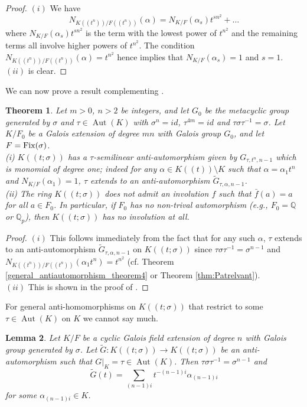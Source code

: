 \documentclass{amsart}
\theoremstyle{plain}
\newtheorem{theorem}{Theorem}[section]
\newtheorem{lemma}[theorem]{Lemma}
\theoremstyle{definition}
\numberwithin{equation}{section}
\numberwithin{figure}{section}
\DeclareMathOperator{\Aut}{Aut}
\begin{document}
 \begin{proof} $(i)$ We have
 $$N_{K((t^n))/F((t^n))}(\alpha)=N_{K/F}(\alpha_s)t^{sn^2}+\dots $$
 where $N_{K/F}(\alpha_s)t^{sn^2}$ is the term with the lowest power of $t^{n^2}$ and the remaining terms all involve higher powers of $t^{n^2}$. The condition
 $N_{K((t^n))/F((t^n))}(\alpha)=t^{n^2}$ hence implies that $N_{K/F}(\alpha_s)=1$ and $s=1$.
 \\ $(ii)$ is clear.
 \end{proof}


We can now  prove a result complementing \cite[Theorem 4.4]{MST}.

\begin{theorem}\label{thm:Patmain}
Let $m>0$, $n>2$ be integers, and let $G_0$ be the metacyclic group generated by $\sigma$ and $\tau\in \Aut(K)$ with $\sigma^n=id$, $\tau^{4m}=id$ and $\tau\sigma\tau^{-1}=\sigma$.
Let $K/F_0$ be a  Galois extension of degree $mn$ with Galois group $G_0$, and let $F={\rm Fix}(\sigma)$.
\\ (i) $K((t;\sigma))$ has a $\tau$-semilinear anti-automorphism given by $G_{\tau,t^n,n-1}$ which is monomial of degree one; indeed for any  $\alpha\in K((t))\setminus K$ such that $\alpha=\alpha_1 t^n$ and $N_{K/F}(\alpha_1)=1$, $\tau$ extends to an anti-automorphism $\widetilde G_{\tau,\alpha,n-1}$.
\\ (ii)
The ring $K((t;\sigma))$ does not admit an involution $f$ such that $\bar f(a)=a$ for all $a\in F_0$. In particular, if $F_0$ has no non-trival automorphism (e.g., $F_0=\mathbb{Q}$ or $\mathbb{Q}_p$), then $K((t;\sigma))$ has no involution at all.
\end{theorem}

\begin{proof}
$(i)$ This follows immediately from the fact  that for any  such $\alpha$, $\tau$ extends to an anti-automorphism $\widetilde G_{\tau,\alpha,n-1}$ on  $K((t;\sigma))$ since  $\tau \sigma\tau^{-1}=\sigma^{n-1}$ and $N_{K((t^n))/F((t^n))}(\alpha_1 t^n)=t^{n^2}$ (cf. Theorem \ref{general_antiautomorphism_theorem4} or Theorem \ref{thm:Patrelvant}).
\\ $(ii)$
This is shown in the proof of \cite[Theorem 4.4]{MST}.
\end{proof}

For general anti-homomorphisms on $K((t;\sigma))$ that restrict to some $\tau\in \Aut(K)$ on $K$ we cannot say much.


\begin{lemma}
 Let $K/F$ be a cyclic Galois field extension of degree $n$ with Galois group generated by $\sigma$.
  Let $\widetilde G:K((t;\sigma))\to K((t;\sigma))$ be an anti-automorphism such that $G|_K=\tau\in \Aut(K)$. Then
  $\tau \sigma\tau^{-1}=\sigma^{n-1}$ and
   $$\widetilde G(t) = \sum_{(n-1)i} t^{-(n-1)i}  \alpha_{(n-1)i}$$
    for some $\alpha_{(n-1)i} \in K$.
\end{lemma}
\end{document}
